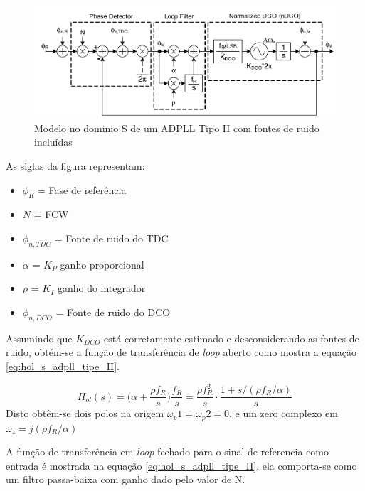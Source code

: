 \begin{figure}[htb]
	\caption{Modelo no dominio S de um ADPLL Tipo II com fontes de ruido incluídas}
	\begin{center}
		\includegraphics[scale=0.6]{img/adpll_type_II_s_domain.png}
	\end{center}
	\label{fig:adpll_type_II_s_domain}
\end{figure}

As siglas da figura representam:

\begin{itemize}
	\item $\phi_{R}$ = Fase de referência
	\item $N$ = FCW
	\item $\phi_{n,TDC}$ = Fonte de ruido do TDC
	\item $\alpha$ = $K_P$ ganho proporcional
	\item $\rho$ = $K_I$ ganho do integrador
	\item $\phi_{n,DCO}$ = Fonte de ruido do DCO
\end{itemize}

Assumindo que $K_{DCO}$ está corretamente estimado e desconsiderando as fontes de ruido, obtém-se a função de transferência de \textit{loop} aberto como mostra a equação \ref{eq:hol_s_adpll_tipe_II}.

	\begin{equation}
	H_{ol}(s) = \big( \alpha + \frac{\rho f_R}{s} \big) \frac{f_R}{s} = \frac{\rho f_R^2}{s} \cdot \frac{1 + s/(\rho f_R / \alpha)}{s}
	\label{eq:hol_s_adpll_tipe_II}
	\end{equation}
Disto obtêm-se dois polos na origem $\omega_p1 = \omega_p2 = 0$, e um zero complexo em $\omega_z = j(\rho f_R / \alpha) $

A função de transferência em \textit{loop} fechado para o sinal de referencia como entrada é mostrada na equação \ref{eq:hol_s_adpll_tipe_II}, ela comporta-se como um filtro passa-baixa com ganho dado pelo valor de N.

